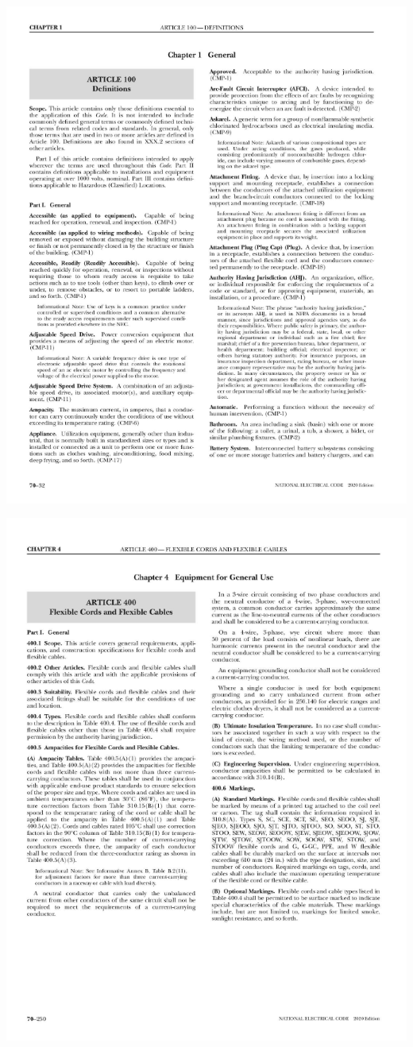 \begin{center}
	\includegraphics[scale=1]{./images/nec2020_1}
\end{center}
\newpage
\begin{center}
	\includegraphics[scale=1]{./images/nec2020_4}
\end{center}
